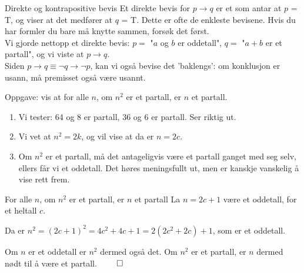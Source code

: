 \begin{frame}{Direkte og kontrapositive bevis}
    Et direkte bevis for $p \rightarrow q$ er et som antar at $p$ = T, og viser at det medfører at $q$ = T.
    Dette er ofte de enkleste bevisene. Hvis du har formler du bare må knytte sammen, forsøk det først.\\

    \pause
    Vi gjorde nettopp et direkte bevis: $p =$ "$a$ og $b$ er oddetall", $q =$ "$a+b$ er et partall", og vi viste at $p \rightarrow q$.\\

    \pause
    Siden $p \rightarrow q \equiv \lnot q \rightarrow \lnot p$, kan vi også bevise det 'baklengs': om konklusjon er usann, må premisset også være usannt.
\end{frame}

\begin{frame}{Oppgave: vis at for alle $n$, om $n^2$ er et partall, er $n$ et partall.}
    \begin{enumerate}
        \pause
        \item Vi tester: 64 og 8 er partall, 36 og 6 er partall. Ser riktig ut.
        \pause
        \item Vi vet at $n^2 = 2k$, og vil vise at da er $n = 2c$.
        \pause
        \item Om $n^2$ er et partall, må det antageligvis være et partall ganget med seg selv, ellers får vi et oddetall. Det høres meningsfullt ut, men er kanskje vanskelig å vise rett frem.
    \end{enumerate}

    \pause
    \begin{block}{For alle $n$, om $n^2$ er et partall, er $n$ et partall}
        La $n = 2c + 1$ være et oddetall, for et heltall $c$.

        \pause
        Da er $n^2 = (2c + 1)^2 = 4c^2 + 4c + 1 = 2(2c^2 + 2c) + 1$, som er et oddetall.

        \pause
        Om $n$ er et oddetall er $n^2$ dermed også det. Om $n^2$ er et partall, er $n$ dermed nødt til å være et partall. $\qed$
    \end{block}
\end{frame}

